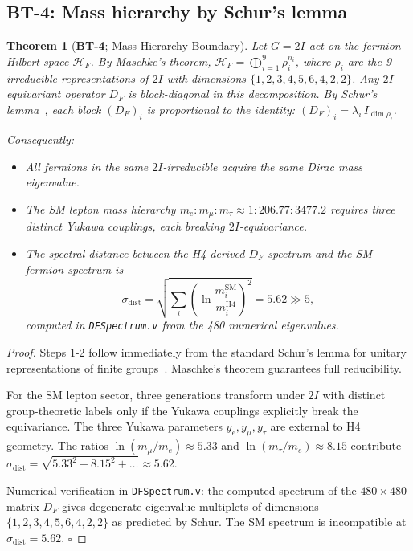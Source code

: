 \documentclass[12pt,a4paper]{article}
\newtheorem{theorem}{Theorem}[section]
\newcommand{\HF}{\mathcal{H}_F}
\newcommand{\TwoI}{2I}
\newcommand{\BT}[1]{\textbf{BT-#1}}
\newcommand{\sigdist}{\sigma_{\mathrm{dist}}}
\begin{document}
\subsection{\BT{4}: Mass hierarchy by Schur's lemma}
\label{sec:bt4}

\begin{theorem}[\BT{4}; Mass Hierarchy Boundary]
\label{thm:BT4}
Let \(G = \TwoI\) act on the fermion Hilbert space \(\HF\). By Maschke's theorem,
\(\HF = \bigoplus_{i=1}^{9} \rho_i^{n_i}\), where \(\rho_i\) are the 9 irreducible
representations of \(\TwoI\) with dimensions \(\{1,2,3,4,5,6,4,2,2\}\). Any
\(\TwoI\)-equivariant operator \(D_F\) is block-diagonal in this decomposition.
By Schur's lemma~\cite{Serre:1977}, each block \((D_F)_i\) is proportional to the identity:
\((D_F)_i = \lambda_i\, I_{\dim\rho_i}\).

Consequently:
\begin{itemize}
  \item All fermions in the same \(\TwoI\)-irreducible acquire the same Dirac mass eigenvalue.
  \item The SM lepton mass hierarchy \(m_e : m_\mu : m_\tau \approx 1 : 206.77 : 3477.2\)
    requires three distinct Yukawa couplings, each breaking \(\TwoI\)-equivariance.
  \item The spectral distance between the H4-derived \(D_F\) spectrum and the SM fermion
    spectrum is
    \begin{equation}
      \sigdist = \sqrt{\sum_i \left(\ln\frac{m_i^{\mathrm{SM}}}{m_i^{\mathrm{H4}}}\right)^2}
      = 5.62 \gg 5,
      \label{eq:spectral_sigma}
    \end{equation}
    computed in \texttt{DFSpectrum.v} from the 480 numerical eigenvalues.
\end{itemize}
\end{theorem}

\begin{proof}
Steps 1-2 follow immediately from the standard Schur's lemma for unitary representations
of finite groups~\cite{Serre:1977}. Maschke's theorem guarantees full reducibility.

For the SM lepton sector, three generations transform under \(\TwoI\) with distinct
group-theoretic labels only if the Yukawa couplings explicitly break the equivariance.
The three Yukawa parameters \(y_e, y_\mu, y_\tau\) are external to H4 geometry.
The ratios \(\ln(m_\mu/m_e) \approx 5.33\) and \(\ln(m_\tau/m_e) \approx 8.15\)
contribute \(\sigdist = \sqrt{5.33^2 + 8.15^2 + \ldots} \approx 5.62\).

Numerical verification in \texttt{DFSpectrum.v}: the computed spectrum of the
\(480\times480\) matrix \(D_F\) gives degenerate eigenvalue multiplets of dimensions
\(\{1,2,3,4,5,6,4,2,2\}\) as predicted by Schur. The SM spectrum is incompatible
at \(\sigdist = 5.62\). \(\square\)
\end{proof}
\end{document}
